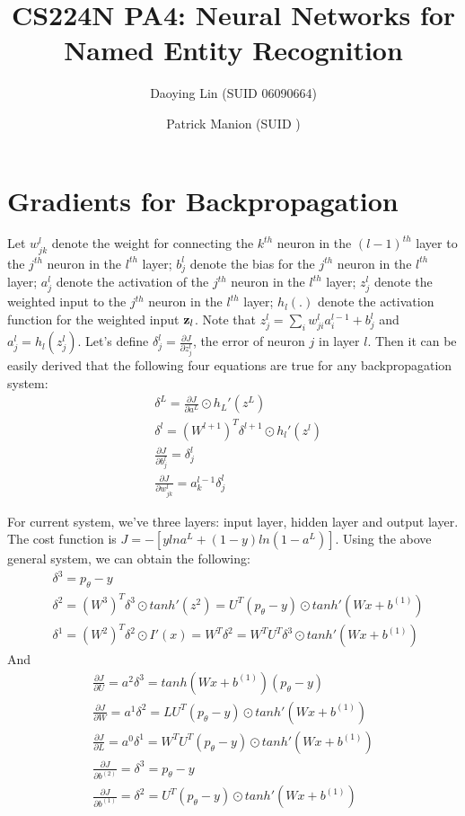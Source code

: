 \documentclass[11pt, oneside]{article}   	%
\title{CS224N PA4: Neural Networks for Named Entity Recognition}
\author{
	Daoying Lin (SUID 06090664)\\
	\and
	Patrick Manion (SUID )
}
\date{}							%
\begin{document}
\maketitle

\section{Gradients for Backpropagation}
Let $w_{jk}^l$ denote the weight for connecting the $k^{th}$ neuron in the $(l-1)^{th}$ layer to the $j^{th}$ neuron in the $l^{th}$ layer; $b_j^l$ denote the bias for the $j^{th}$ neuron in the $l^{th}$ layer; $a_j^l$ denote the activation of the $j^{th}$ neuron in the $l^{th}$ layer; $z_j^l$ denote the weighted input to the $j^{th}$ neuron in the $l^{th}$ layer; $h_l(.)$ denote the activation function for the weighted input $\bold{z}_l$.  Note that $z_j^l = \sum_{i} w_{ji}^l a_i^{l-1} + b_j^l$ and $a_j^l = h_l(z_j^l)$. Let's define $\delta_j^l = \frac{\partial J}{\partial z_j^l}$, the error of neuron $j$ in layer $l$. Then it can be easily derived that the following four equations are true for any backpropagation system:
\begin{subequations}
\begin{align}
& \delta^L = \frac{\partial J}{ \partial a^L} \odot h_L'(z^L) \\
& \delta^l  = (W^{l+1})^T \delta^{l+1} \odot h_l'(z^l) \\
& \frac{\partial J}{ \partial b_j^l}   = \delta_j^l \\
& \frac{\partial J}{\partial w^l_{jk}} = a_k^{l-1} \delta_j^l 
\end{align}
\end{subequations}

For current system, we've three layers: input layer, hidden layer and output layer. The cost function is $J = - [y lna^L + (1-y) ln(1- a^L)]$. Using the above general system, we can obtain the following:
\begin{subequations}
\begin{align}
& \delta^3 =  p_{\theta} - y\\
& \delta^2 = (W^3)^T \delta^3 \odot tanh'(z^2) = U^T (p_{\theta} - y)  \odot tanh'(Wx + b^{(1)}) \\
& \delta^1 = (W^2)^T \delta^2  \odot I'(x)= W^T \delta^2 = W^T U^T \delta^3 \odot tanh'(Wx + b^{(1)})
\end{align}
\end{subequations}
And
\begin{subequations}
\begin{align}
\frac{\partial J}{ \partial U} = a^2 \delta^3 = tanh(Wx + b^{(1)}) (p_{\theta} - y) \\
\frac{\partial J}{ \partial W} = a^1 \delta^2 = LU^T(p_{\theta} - y) \odot tanh'(Wx + b^{(1)}) \\
\frac{\partial J}{ \partial L} = a^0 \delta^1 = W^T U^T (p_{\theta} - y) \odot tanh'(Wx + b^{(1)})  \\
\frac{\partial J}{ \partial b^{(2)}} = \delta^3 = p_{\theta} - y \\
\frac{\partial J}{ \partial b^{(1)}} = \delta^2 = U^T(p_{\theta} - y) \odot tanh'(Wx + b^{(1)}) 
\end{align}
\end{subequations}
\end{document}
